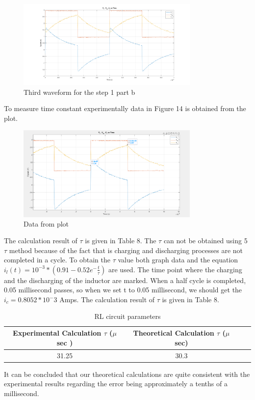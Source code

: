 \documentclass[letterpaper,12pt]{article}
\begin{document}
\begin{figure}[H]
	\centering
   \includegraphics[width=0.8\textwidth]{1b_3.png}
   \caption{Third waveform for the step 1 part b}
\end{figure} 
To measure time constant experimentally data in Figure 14 is obtained from the plot.
\begin{figure}[H]
	\centering
   \includegraphics[width=0.8\textwidth]{1_b_3_plot_data.png}
   \caption{Data from plot}
\end{figure} 
The calculation result of \(\tau\) is given in Table 8. The \(\tau\) can not be obtained using 5 \(\tau\) method because of the fact that is charging and discharging processes are not completed in a cycle. To obtain the \(\tau\) value both graph data and the equation \( i_l (t) = 10^{-3} * (0.91 - 0.52 e^-\frac{t}{\tau}) \)  are used. The time point where the charging and the discharging of the inductor are marked. When a half cycle is completed, 0.05 millisecond passes, so when we set t to 0.05 millisecond, we should get the \( i_c  = 0.8052*10^-3\) Amps. The calculation result of \( \tau \) is given in Table 8.
%
\begin{table}[H]
	\begin{center}
	\caption{RL circuit parameters}
	\vspace{2mm}
		\begin{tabular}{||c | c | c | c||} 
		 \hline
		 Experimental Calculation \(\tau\) (\(\mu\) sec )& Theoretical Calculation \(\tau\) (\(\mu\) sec) \\ [0.5ex] 
		 \hline\hline
		 31.25 & 30.3 \\ 
		 \hline
	\end{tabular}
	\end{center}
	\end{table}
It can be concluded that our theoretical calculations are quite consistent with the experimental results regarding the error being approximately a tenths of a millisecond.
\end{document}
